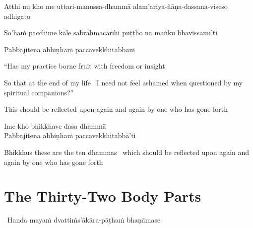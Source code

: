 \begin{pali-hang}
  Atthi nu kho me uttari-manussa-dhammā alam'ariya-ñāṇa-dassana-viseso adhigato
\end{pali-hang}
\ifbfiveversion\clearpage\fi
\begin{pali-hang-together}
  So'haṁ pacchime kāle sabrahmacārīhi puṭṭho na maṅku bhavissāmī'ti
\end{pali-hang-together}
\begin{pali-hang-together}
  Pabbajitena abhiṇhaṁ paccavekkhitabbaṁ
\end{pali-hang-together}

\begin{english-verses}
  ``Has my practice borne fruit with freedom or insight\\
  \begin{english-hang-together-verses}
    So that at the end of my life \breathmark\ I need not feel ashamed when questioned by my spiritual companions?''
  \end{english-hang-together-verses}
  \begin{english-hang-together-verses}
    This should be reflected upon again and again by one who has gone forth
  \end{english-hang-together-verses}
\end{english-verses}

Ime kho bhikkhave dasa dhammā\\
Pabbajitena abhiṇhaṁ paccavekkhitabbā'ti

\begin{english-hang-verses}
  Bhikkhus these are the ten dhammas \breathmark\ which should be reflected upon again and again by one who has gone forth
\end{english-hang-verses}

\suttaRef{[AN 10.48]}

\ifdigitalversion{}\fi



\section{The Thirty-Two Body Parts}
\label{32-parts}

\begin{leader}
  \anglebracketleft\ \hspace{-0.5mm}Handa mayaṁ dvattiṁs'ākāra-pāṭhaṁ bhaṇāmase \hspace{-0.5mm}\anglebracketright\
\end{leader}

